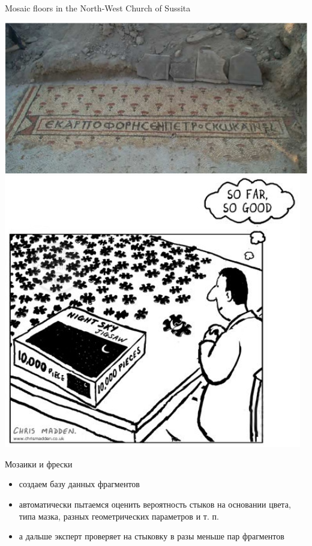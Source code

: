 \documentclass[13pt, t]{beamer}
\begin{document}

\begin{frame}{Mosaic floors in the North-West Church of Sussita}
\begin{center}
\includegraphics[width=0.6\linewidth]{images/01-Mosaik.jpg}
\pause
\vfill
\includegraphics[width=0.5\linewidth]{images/02-Mosaik.jpg}
\end{center}
\end{frame}

\begin{frame}{Мозаики и фрески}
\begin{itemize}
\item создаем базу данных фрагментов
\item автоматически пытаемся оценить вероятность стыков на основании цвета, типа мазка, разных геометрических параметров и т. п.
\pause
\item а дальше эксперт проверяет на стыковку в разы меньше пар фрагментов
\end{itemize}
\end{frame}

\end{document}
